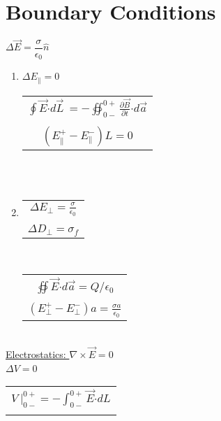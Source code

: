 \documentclass[12pt]{article}
\newcommand{\dotP}{\boldsymbol \cdot}		%
\begin{document}
\section{Boundary Conditions}
\begin{minipage}[t]{.45\textwidth}
	\hfill \break
	\( \boxed{ \Delta \vec{E} = \dfrac{\sigma}{\epsilon_0} \hat{n} } \)
	\begin{enumerate}
		\item {
			\( \boxed{ \displaystyle \Delta E_{\parallel} = 0 } \)  \ \ \ 
			\begin{tabular}{|c}
				\( \displaystyle \oint \vec{E} \dotP d\vec{L} \ = 
					- \oiint_{0-}^{0+} \frac{\partial \vec{B}}{\partial t} \dotP d\vec{a} \) \\ \\
				\( \displaystyle (E_{\parallel}^{+} - E_{\parallel}^{-}) L = 0 \)
			\end{tabular}
		} \\ \\
		\item {
			\begin{tabular}{c}
				\( \boxed{ \displaystyle \Delta E_{\perp} = \frac{\sigma}{\epsilon_0} } \) \\ \\
				\( \boxed{ \displaystyle \Delta D_{\perp} = \sigma_f } \)
			\end{tabular}
			\ \ \
			\begin{tabular}{|c}
				\( \displaystyle \oiint \vec{E} \dotP d\vec{a} = Q/\epsilon_0 \) \\ \\
				\( \displaystyle ( E_{\perp}^{+} - E_{\perp}^{-} ) a = \frac{\sigma a}{\epsilon_0} \) 
			\end{tabular}
		}
	\end{enumerate}

	\hfill \break \\
	\underline{Electrostatics: \( \nabla \times \vec{E} = 0 \) } \\
	
	\( \boxed{ \Delta V = 0 } \) \ \ \ 
	\begin{tabular}{|c}
		\\
		\( \displaystyle V \ \bigg|_{0-}^{0+}= - \int_{0-}^{0+} \vec{E} \dotP dL \)\\
		\\
	\end{tabular}


\end{minipage}
\end{document}
